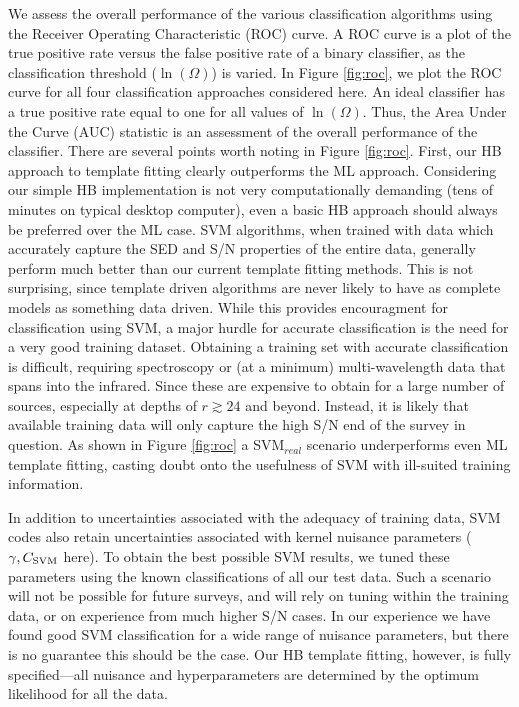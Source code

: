 \documentclass[12pt,preprint]{aastex}
\begin{document}
We assess the overall performance of the various classification
algorithms using the Receiver Operating Characteristic (ROC) curve.  A
ROC curve is a plot of the true positive rate versus the false
positive rate of a binary classifier, as the classification threshold
($\ln(\Omega)$) is varied.  In Figure \ref{fig:roc}, we plot the ROC
curve for all four classification approaches considered here.  An
ideal classifier has a true positive rate equal to one for all values
of $\ln(\Omega)$.  Thus, the Area Under the Curve (AUC) statistic is
an assessment of the overall performance of the classifier.  There are
several points worth noting in Figure \ref{fig:roc}.  First, our HB
approach to template fitting clearly outperforms the ML approach.
Considering our simple HB implementation is not very computationally
demanding (tens of minutes on typical desktop computer), even a basic
HB approach should always be preferred over the ML case.  SVM
algorithms, when trained with data which accurately capture the SED
and S/N properties of the entire data, generally perform much better
than our current template fitting methods.  This is not surprising,
since template driven algorithms are never likely to have as complete
models as something data driven.  While this provides encouragment for
classification using SVM, a major hurdle for accurate classification
is the need for a very good training dataset.  Obtaining a training
set with accurate classification is difficult, requiring spectroscopy
or (at a minimum) multi-wavelength data that spans into the infrared.
Since these are expensive to obtain for a large number of sources,
especially at depths of $r\gtrsim24$ and beyond.  Instead, it is
likely that available training data will only capture the high S/N end
of the survey in question.  As shown in Figure \ref{fig:roc} a
SVM$_{real}$ scenario underperforms even ML template fitting,
casting doubt onto the usefulness of SVM with ill-suited training
information.

In addition to uncertainties associated with the adequacy of training
data, SVM codes also retain uncertainties associated with kernel
nuisance parameters ($\gamma,C_{\rm SVM}$ here).  To obtain the best
possible SVM results, we tuned these parameters using the known
classifications of all our test data.  Such a scenario will not be
possible for future surveys, and will rely on tuning within the
training data, or on experience from much higher S/N cases.  In our
experience we have found good SVM classification for a wide range of
nuisance parameters, but there is no guarantee this should be the
case.  Our HB template fitting, however, is fully specified---all
nuisance and hyperparameters are determined by the optimum likelihood
for all the data.
\end{document}
